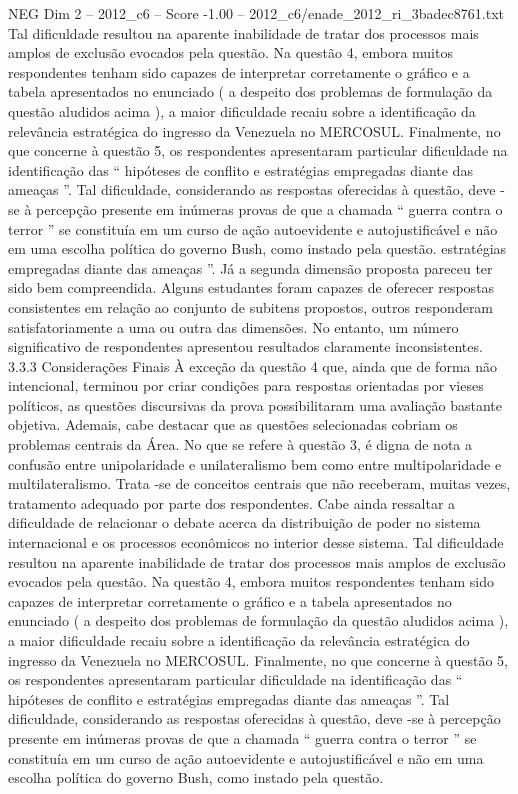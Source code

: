 \begin{textsample}{NEG Dim 2 – 2012\_c6 – Score -1.00 – 2012\_c6/enade\_2012\_ri\_3badec8761.txt}
Tal dificuldade resultou na aparente inabilidade de tratar dos processos mais amplos de exclusão evocados pela questão.
Na questão 4, embora muitos respondentes tenham sido capazes de interpretar corretamente o gráfico e a tabela apresentados no enunciado ( a despeito dos problemas de formulação da questão aludidos acima ), a maior dificuldade recaiu sobre a identificação da relevância estratégica do ingresso da Venezuela no MERCOSUL.
Finalmente, no que concerne à questão 5, os respondentes apresentaram particular dificuldade na identificação das “ hipóteses de conflito e estratégias empregadas diante das ameaças ”.
Tal dificuldade, considerando as respostas oferecidas à questão, deve -se à percepção presente em inúmeras provas de que a chamada “ guerra contra o terror ” se constituía em um curso de ação autoevidente e autojustificável e não em uma escolha política do governo Bush, como instado pela questão. estratégias empregadas diante das ameaças ”.
Já a segunda dimensão proposta pareceu ter sido bem compreendida.
Alguns estudantes foram capazes de oferecer respostas consistentes em relação ao conjunto de subitens propostos, outros responderam satisfatoriamente a uma ou outra das dimensões.
No entanto, um número significativo de respondentes apresentou resultados claramente inconsistentes. 3.3.3 Considerações Finais À exceção da questão 4 que, ainda que de forma não intencional, terminou por criar condições para respostas orientadas por vieses políticos, as questões discursivas da prova possibilitaram uma avaliação bastante objetiva.
Ademais, cabe destacar que as questões selecionadas cobriam os problemas centrais da Área.
No que se refere à questão 3, é digna de nota a confusão entre unipolaridade e unilateralismo bem como entre multipolaridade e multilateralismo.
Trata -se de conceitos centrais que não receberam, muitas vezes, tratamento adequado por parte dos respondentes.
Cabe ainda ressaltar a dificuldade de relacionar o debate acerca da distribuição de poder no sistema internacional e os processos econômicos no interior desse sistema.
Tal dificuldade resultou na aparente inabilidade de tratar dos processos mais amplos de exclusão evocados pela questão.
Na questão 4, embora muitos respondentes tenham sido capazes de interpretar corretamente o gráfico e a tabela apresentados no enunciado ( a despeito dos problemas de formulação da questão aludidos acima ), a maior dificuldade recaiu sobre a identificação da relevância estratégica do ingresso da Venezuela no MERCOSUL.
Finalmente, no que concerne à questão 5, os respondentes apresentaram particular dificuldade na identificação das “ hipóteses de conflito e estratégias empregadas diante das ameaças ”.
Tal dificuldade, considerando as respostas oferecidas à questão, deve -se à percepção presente em inúmeras provas de que a chamada “ guerra contra o terror ” se constituía em um curso de ação autoevidente e autojustificável e não em uma escolha política do governo Bush, como instado pela questão.

\end{textsample}
